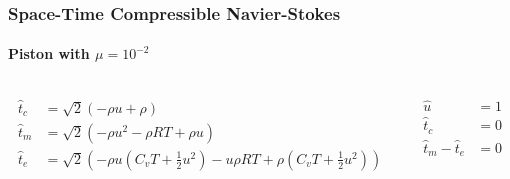 \documentclass[18pt,xcolor=table]{beamer}
\begin{document}
\begin{frame}[t]
\frametitle{Space-Time Compressible Navier-Stokes}
\framesubtitle{Piston with $\mu=10^{-2}$}  %

\vspace{-2ex}
\begin{columns}[t]
\begin{column}[c]{0.7\textwidth}
\small
\begin{align*}
\hat t_c&=\sqrt{2}(-\rho u+\rho)\\
\hat t_m&=\sqrt{2}(-\rho u^2-\rho RT+\rho u)\\
\hat t_e&=\sqrt{2}(-\rho u(C_vT+\frac{1}{2}u^2)-u\rho RT+\rho(C_vT+\frac{1}{2}u^2))
\end{align*}
\end{column}
\begin{column}[c]{0.3\textwidth}
\small
\begin{align*}
\hat u&=1\\
\hat t_c&=0\\
\hat t_m - \hat t_e&=0
\end{align*}
\end{column}
\end{columns}


\end{frame}
\end{document}
